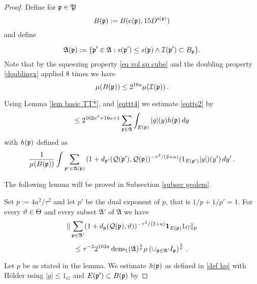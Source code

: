 \begin{proof}
Define for $\mathfrak p\in \mathfrak P$
\begin{equation}
B(\mathfrak p):=B(\mathrm{c}(\mathfrak p), 15D^{\mathrm{s}(\mathfrak p)})
\end{equation}
and define

    \begin{equation}
        \label{eq Dp definition}
        \mathfrak{A}(\mathfrak p):=\{\mathfrak p'\in\mathfrak{A}: s(\mathfrak p')\leq s(\mathfrak p) \land  \mathcal{I}(\mathfrak p') \subset B_{\mathfrak p}\}.
    \end{equation}
Note that by the squeezing property \eqref{eq vol sp cube}
and the doubling property \eqref{doublingx} applied
$8$ times we have
\begin{equation}\label{eqttt4}
    \mu(B(\mathfrak p))\le 2^{16a} \mu(\mathcal{I}(\mathfrak p))\, .
\end{equation}

 Using Lemma \ref{lem basic TT*}, and \eqref{eqttt4} we estimate \eqref{eqtts2} by
  \begin{equation}\label{eqtts3}
 \le  2^{162a^3+16a+1} \sum_{\mathfrak p\in \mathfrak{A}}
 \int_{E(\mathfrak p)}|g|(y) h(\mathfrak p)\, dy
         \end{equation}
with $h(\mathfrak p)$ defined as
\begin{equation}\label{def hp}
    \frac 1{\mu(B(\mathfrak p))}\int \sum_{\mathfrak p'\in \mathfrak{A}(\mathfrak p)}
{(1+d_{\mathfrak p'}(\mathcal{Q}(\mathfrak p'), \mathcal{Q}(\mathfrak p))^{-\tau^2/(2+a)}}(1_{E(\mathfrak p')}|g|)(y')\, dy'\,.
\end{equation}

 The following lemma will be proved in Subsection \ref{subsec geolem}.
\begin{lemma}
\label{lem antichain 1}
Set $p:=4a^2/\tau^2$ and let $p'$ be the dual exponent of $p$, that is $1/p+1/p'=1$.
For  every $\vartheta\in\Theta$ and every subset $\mathfrak{A}'$ of $\mathfrak{A}$ we have
\begin{equation}
    \label{eq antichain Lp}
    \|\sum_{\mathfrak p\in\mathfrak{A}'}(1+d_{\mathfrak p}(\mathcal{Q}(\mathfrak p), \vartheta))^{-\tau^2/(2+a)}\mathbf{1}_{E(\mathfrak p)}1_G\|_{p}
    \end{equation}
    \begin{equation}
    \le \tau^{-2}
2^{102a}\operatorname{\operatorname{dens}}_1(\mathfrak{A})^{\frac 1p}\mu\left(\cup_{\mathfrak p\in\mathfrak{A}'}I_{\mathfrak p}\right)^{\frac 1p}\, .
\end{equation}
\end{lemma}

Let $p$ be as stated in the lemma.
   We estimate $h(\mathfrak p)$ as defined in \eqref{def hp} with H\"older using  $|g|\le 1_G$ and $E(\mathfrak p')\subset B(\mathfrak p)$ by


\end{proof}
